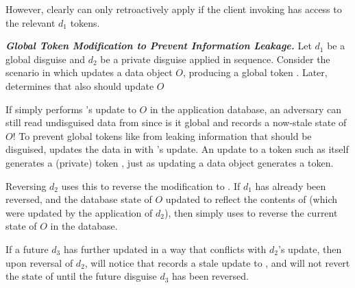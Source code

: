 However, clearly \sys can only retroactively apply  if the client invoking  has
access to the relevant $d_1$ tokens.


\vspace{6pt}\noindent\textbf{\emph{Global Token Modification to Prevent Information Leakage.}}
%
Let $d_1$ be a global disguise and $d_2$ be a private disguise applied in sequence.  Consider the
scenario in which  updates a data object $O$, producing a global token . Later,
\sys determines that  also should update $O$ 

If \sys simply performs 's update to $O$ in the application database, an adversary can still
read undisguised data from  since is it global and records a now-stale state of $O$!
%
%
To prevent global tokens like  from leaking information that should be disguised, \sys
updates the data in  with 's update. An update to a token such as 
itself generates a (private) token , just as updating a data object generates a token.

Reversing $d_2$ uses this  to reverse the modification to . 
If $d_1$ has already been reversed, and the database state of $O$ updated to reflect the contents
of  (which were updated by the application of $d_2$), 
then \sys simply uses  to reverse the current state of $O$ in the database. 

If a future $d_3$ has further updated  in a way that conflicts with $d_2$'s update,
then upon reversal of $d_2$, \sys will notice that  records a stale update to , 
and will not revert
the state of  until the future disguise $d_3$ has been reversed.




